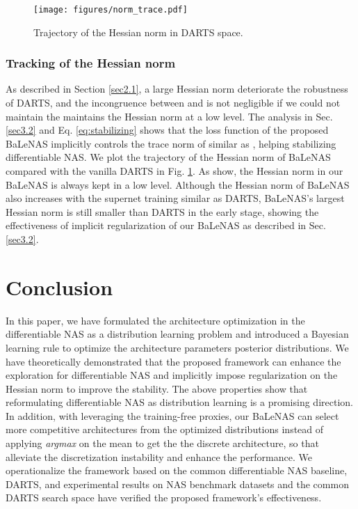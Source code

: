 \documentclass[10pt,twocolumn,letterpaper]{article}
\begin{document}
\begin{figure}[t]
  \centering
  \texttt{[image: figures/norm\_trace.pdf]}
  \caption{Trajectory of the Hessian norm in DARTS space.}
\label{fig:trace_norm}
\vspace{-2mm}
\end{figure}


\subsubsection{Tracking of the Hessian norm}
As described in Section \ref{sec2.1}, a large Hessian norm deteriorate the robustness of DARTS, and the incongruence between  and  is not negligible if we could not maintain the maintains the Hessian norm at a low level. The analysis in Sec. \ref{sec3.2} and Eq. \eqref{eq:stabilizing} shows that the loss function of the proposed BaLeNAS implicitly controls the trace norm of  similar as \cite{chen2020stabilizing,chen2020drnas}, helping stabilizing differentiable NAS. We plot the trajectory of the Hessian norm of BaLeNAS compared with the vanilla DARTS in Fig. \ref{fig:trace_norm}. As show, the Hessian norm in our BaLeNAS is always kept in a low level. Although the Hessian norm of BaLeNAS also increases with the supernet training similar as DARTS, BaLeNAS's largest Hessian norm is still smaller than DARTS in the early stage, showing the effectiveness of implicit regularization of our BaLeNAS as described in Sec. \ref{sec3.2}.

\section{Conclusion}
In this paper, we have formulated the architecture optimization in the differentiable NAS as a distribution learning problem and introduced a Bayesian learning rule to optimize the architecture parameters posterior distributions. We have theoretically demonstrated that the proposed framework can enhance the exploration for differentiable NAS and implicitly impose regularization on the Hessian norm to improve the stability. The above properties show that reformulating differentiable NAS as distribution learning is a promising direction. In addition, with leveraging the training-free proxies, our BaLeNAS can select more competitive architectures from the optimized distributions instead of applying \textit{argmax} on the mean to get the the discrete architecture, so that alleviate the discretization instability and enhance the performance. We operationalize the framework based on the common differentiable NAS baseline, DARTS, and experimental results on NAS benchmark datasets and the common DARTS search space have verified the proposed framework's effectiveness. 
\end{document}
